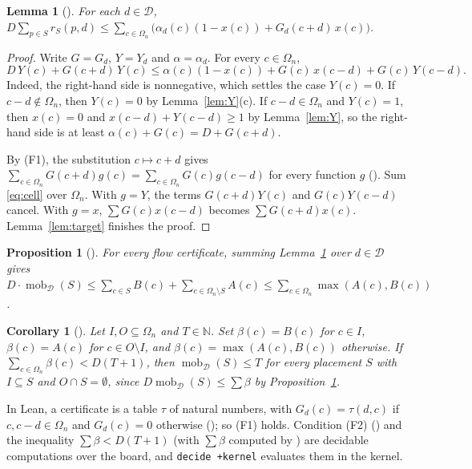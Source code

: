 \documentclass[11pt]{amsart}
\theoremstyle{plain}
\newtheorem{lemma}[theorem]{Lemma}
\newtheorem{proposition}[theorem]{Proposition}
\newtheorem{corollary}[theorem]{Corollary}
\theoremstyle{definition}
\newcommand{\N}{\mathbb{N}}
\newcommand{\mob}{\operatorname{mob}}
\begin{document}
\begin{lemma}[]\label{lem:dir}
For each $d\in\mathcal D$,
$D\sum_{p\in S}r_S(p,d)\le\sum_{c\in\Omega_n}\bigl(\alpha_d(c)(1-x(c))+G_d(c+d)\,x(c)\bigr)$.
\end{lemma}

\begin{proof}
Write $G=G_d$, $Y=Y_d$ and $\alpha=\alpha_d$. For every $c\in\Omega_n$,
\begin{equation}\label{eq:cell}
D\,Y(c)+G(c+d)\,Y(c)\le\alpha(c)(1-x(c))+G(c)\,x(c-d)+G(c)\,Y(c-d).
\end{equation}
Indeed, the right-hand side is nonnegative, which settles the case $Y(c)=0$. If $c-d\notin\Omega_n$, then $Y(c)=0$ by Lemma~\ref{lem:Y}(c). If $c-d\in\Omega_n$ and $Y(c)=1$, then $x(c)=0$ and $x(c-d)+Y(c-d)\ge1$ by Lemma~\ref{lem:Y}, so the right-hand side is at least $\alpha(c)+G(c)=D+G(c+d)$.

By (F1), the substitution $c\mapsto c+d$ gives $\sum_{c\in\Omega_n}G(c+d)g(c)=\sum_{c\in\Omega_n}G(c)g(c-d)$ for every function $g$ (). Sum \eqref{eq:cell} over $\Omega_n$. With $g=Y$, the terms $G(c+d)Y(c)$ and $G(c)Y(c-d)$ cancel. With $g=x$, $\sum G(c)x(c-d)$ becomes $\sum G(c+d)x(c)$. Lemma~\ref{lem:target} finishes the proof.
\end{proof}

\begin{proposition}[]\label{prop:key}
For every flow certificate, summing Lemma~\ref{lem:dir} over $d\in\mathcal D$ gives
$D\cdot\mob_{\mathcal D}(S)\le\sum_{c\in S}B(c)+\sum_{c\in\Omega_n\setminus S}A(c)\le\sum_{c\in\Omega_n}\max(A(c),B(c))$.
\end{proposition}

\begin{corollary}[]\label{cor:leaf}
Let $I,O\subseteq\Omega_n$ and $T\in\N$. Set $\beta(c)=B(c)$ for $c\in I$, $\beta(c)=A(c)$ for $c\in O\setminus I$, and $\beta(c)=\max(A(c),B(c))$ otherwise. If $\sum_{c\in\Omega_n}\beta(c)<D(T+1)$, then $\mob_{\mathcal D}(S)\le T$ for every placement $S$ with $I\subseteq S$ and $O\cap S=\emptyset$, since $D\mob_{\mathcal D}(S)\le\sum\beta$ by Proposition~\ref{prop:key}.
\end{corollary}

In Lean, a certificate is a table $\tau$ of natural numbers, with $G_d(c)=\tau(d,c)$ if $c,c-d\in\Omega_n$ and $G_d(c)=0$ otherwise (); so (F1) holds. Condition (F2) () and the inequality $\sum\beta<D(T+1)$ (with $\sum\beta$ computed by ) are decidable computations over the board, and \texttt{decide +kernel} evaluates them in the kernel.
\end{document}
